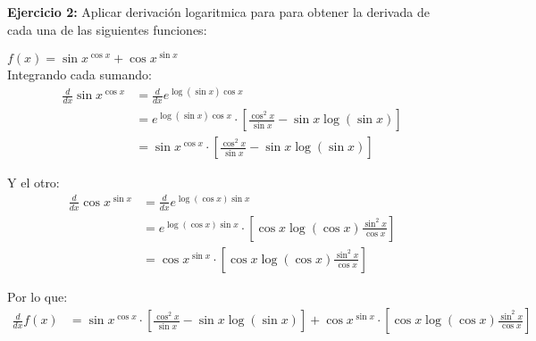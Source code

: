 \documentclass[../main.tex]{subfiles}
\begin{document}
\question \textbf{Ejercicio 2:} Aplicar derivación logaritmica para para obtener la derivada de cada una de las siguientes funciones:
\begin{partes}
    \parte $f(x) = \sin x^{\cos x} + \cos x^{\sin x}$\\

    Integrando cada sumando:
    \begin{align*}
        \frac{d}{dx} \sin x^{\cos x} &= \frac{d}{dx} e^{\log(\sin x){\cos x}}\\
        &= e^{\log(\sin x) \cos x} \cdot \left[\frac{\cos^2 x}{\sin x} - \sin x \log(\sin x)\right]\\ 
        &= \sin x^{\cos x} \cdot \left[\frac{\cos^2 x}{\sin x} - \sin x \log(\sin x)\right] 
    \end{align*}

    Y el otro:
    \begin{align*}
        \frac{d}{dx} \cos x^{\sin x} &= \frac{d}{dx} e^{\log(\cos x){\sin x}}\\
        &= e^{\log(\cos x) \sin x} \cdot \left[\cos x \log(\cos x) \frac{\sin^2 x}{\cos x}\right]\\ 
        &= \cos x^{\sin x} \cdot \left[\cos x \log(\cos x) \frac{\sin^2 x}{\cos x}\right]
    \end{align*}

    Por lo que:
    \begin{align*}
        \frac{d}{dx} f(x) &= \sin x^{\cos x} \cdot \left[\frac{\cos^2 x}{\sin x} - \sin x \log(\sin x)\right]  + \cos x^{\sin x} \cdot \left[\cos x \log(\cos x) \frac{\sin^2 x}{\cos x}\right]
    \end{align*}
\end{partes}
\end{document}
